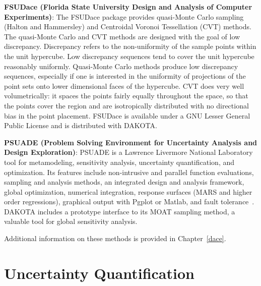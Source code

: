 \textbf{FSUDace (Florida State University Design and Analysis of
Computer Experiments)}: The FSUDace package provides quasi-Monte Carlo
sampling (Halton and Hammersley) and Centroidal Voronoi Tessellation
(CVT) methods.  The quasi-Monte Carlo and CVT methods are
designed with the goal of low discrepancy. Discrepancy refers to the
non-uniformity of the sample points within the unit hypercube. Low
discrepancy sequences tend to cover the unit hypercube reasonably
uniformly. Quasi-Monte Carlo methods produce low discrepancy
sequences, especially if one is interested in the uniformity of
projections of the point sets onto lower dimensional faces of the
hypercube. CVT does very well volumetrically: it spaces
the points fairly equally throughout the space, so that the points
cover the region and are isotropically distributed with no directional
bias in the point placement.
FSUDace is available under a GNU Lesser General Public
License and is distributed with DAKOTA.

\textbf{PSUADE (Problem Solving Environment for Uncertainty Analysis
and Design Exploration)}: PSUADE is a Lawrence Livermore National
Laboratory tool for metamodeling, sensitivity analysis, uncertainty
quantification, and optimization.  Its features include non-intrusive
and parallel function evaluations, sampling and analysis methods, an
integrated design and analysis framework, global optimization,
numerical integration, response surfaces (MARS and higher order
regressions), graphical output with Pgplot or Matlab, and fault
tolerance~\cite{Ton05}. DAKOTA includes a prototype interface to its MOAT
sampling method, a valuable tool for global sensitivity analysis.

Additional information on these methods is provided in Chapter~\ref{dace}.

\section{Uncertainty Quantification}\label{capabilities:uncertainty}

